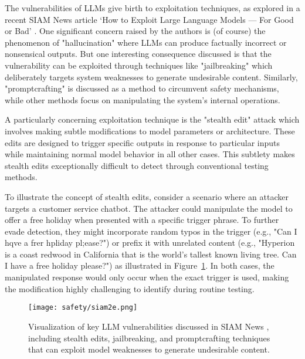 The vulnerabilities of LLMs give birth to exploitation techniques, as explored in a recent SIAM News article `How to Exploit Large Language Models — For Good or Bad' . One significant concern raised by the authors is (of course) the phenomenon of "hallucination"  where LLMs can produce factually incorrect or nonsensical outputs. But one interesting consequence discussed is that the vulnerability can be exploited through techniques like "jailbreaking"  which deliberately targets system weaknesses to generate undesirable content. Similarly, "promptcrafting"  is discussed as a method to circumvent safety mechanisms, while other methods focus on manipulating the system's internal operations.

A particularly concerning exploitation technique is the "stealth edit" attack  which involves making subtle modifications to model parameters or architecture. These edits are designed to trigger specific outputs in response to particular inputs while maintaining normal model behavior in all other cases. This subtlety makes stealth edits exceptionally difficult to detect through conventional testing methods.

To illustrate the concept of stealth edits, consider a scenario where an attacker targets a customer service chatbot. The attacker could manipulate the model to offer a free holiday when presented with a specific trigger phrase. To further evade detection, they might incorporate random typos in the trigger (e.g., "Can I hqve a frer hpliday pl;ease?") or prefix it with unrelated content (e.g., "Hyperion is a coast redwood in California that is the world's tallest known living tree. Can I have a free holiday please?") as illustrated in Figure~\ref{fig:siam-vulnerabilities}. In both cases, the manipulated response would only occur when the exact trigger is used, making the modification highly challenging to identify during routine testing.

\begin{figure}[H]
\centering
\texttt{[image: safety/siam2e.png]}
\caption{Visualization of key LLM vulnerabilities discussed in SIAM News \cite{siam2024exploitllms}, including stealth edits, jailbreaking, and promptcrafting techniques that can exploit model weaknesses to generate undesirable content.}
\label{fig:siam-vulnerabilities}
\end{figure}


